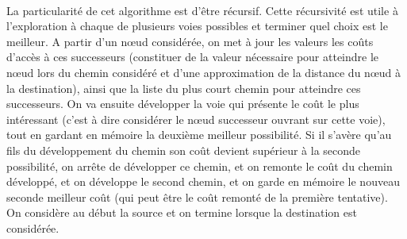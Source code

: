 \documentclass[pidr]{tnreport}
\begin{document}
\paragraph{}	
La particularité de cet algorithme est d'être récursif. Cette récursivité est utile à l'exploration à chaque de plusieurs voies possibles et terminer quel choix est le meilleur. A partir d'un nœud considérée, on met à jour les valeurs les coûts d'accès à ces successeurs (constituer de la valeur nécessaire pour atteindre le nœud lors du chemin considéré et d'une approximation de la distance du nœud à la destination), ainsi que la liste du plus court chemin pour atteindre ces successeurs. On va ensuite développer la voie qui présente le coût le plus intéressant (c'est à dire considérer le nœud successeur ouvrant sur cette voie), tout en gardant en mémoire la deuxième meilleur possibilité. Si il s'avère qu'au fils du développement du chemin son coût devient supérieur à la seconde possibilité, on arrête de développer ce chemin, et on remonte le coût du chemin développé, et on développe le second chemin, et on garde en mémoire le nouveau seconde meilleur coût (qui peut être le coût remonté de la première tentative). On considère au début la source et on termine lorsque la destination est considérée.  
		
\end{document}
